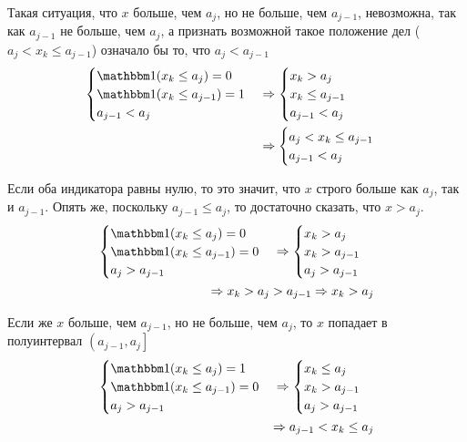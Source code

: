 Такая ситуация,
что $x$ больше, чем $a_j$, но не больше, чем $a_{j-1}$, невозможна,
так как $a_{j-1}$ не больше, чем $a_j$,
а признать возможной такое положение дел ($a_j<x_k\le a_{j-1}$)
означало бы то, что $a_j<a_{j-1}$
\begin{align*}
    \begin{cases}
        \indicator{x_k\le a_j}=0\\
        \indicator{x_k\le a_{j-1}}=1\\
        a_{j-1} < a_j
    \end{cases}
    &\Rightarrow
    \begin{cases}
        x_k>a_j\\
        x_k\le a_{j-1}\\
        a_{j-1} < a_j
    \end{cases}
    \\&\Rightarrow
    \begin{cases}
        a_j<x_k\le a_{j-1}\\
        a_{j-1} < a_j
    \end{cases}
\end{align*}


Если оба индикатора равны нулю,
то это значит, что $x$ строго больше как $a_j$, так и $a_{j-1}$.
Опять же, поскольку $a_{j-1}\le a_j$, то достаточно сказать, что $x>a_j$.
\begin{align*}
    \begin{cases}
        \indicator{x_k\le a_j}=0\\
        \indicator{x_k\le a_{j-1}}=0\\
        a_j > a_{j-1}
    \end{cases}
    \Rightarrow
    \begin{cases}
        x_k>a_j\\
        x_k>a_{j-1}\\
        a_j > a_{j-1}
    \end{cases}
    \\\Rightarrow
        x_k>a_j > a_{j-1}
    \Rightarrow
        x_k>a_j
\end{align*}

Если же $x$ больше, чем $a_{j-1}$, но не больше, чем $a_j$,
то $x$ попадает в полуинтервал $\left(a_{j-1},a_j\right]$
\begin{align*}
    \begin{cases}
        \indicator{x_k\le a_j}=1\\
        \indicator{x_k\le a_{j-1}}=0\\
        a_j > a_{j-1}
    \end{cases}
    \Rightarrow
    \begin{cases}
        x_k\le a_j\\
        x_k>a_{j-1}\\
        a_j > a_{j-1}
    \end{cases}
    \\\Rightarrow
        a_{j-1}<x_k\le a_j
\end{align*}

